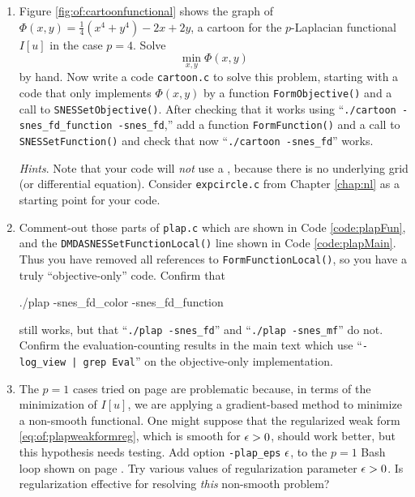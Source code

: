 \begin{enumerate}
\item Figure \ref{fig:of:cartoonfunctional} shows the graph of $\Phi(x,y)=\tfrac{1}{4}(x^4+y^4) - 2x + 2y$, a cartoon for the $p$-Laplacian functional $I[u]$ in the case $p=4$.  Solve
    $$\min_{x,y} \Phi(x,y)$$
by hand.  Now write a \PETSc code \texttt{cartoon.c} to solve this problem, starting with a code that only implements $\Phi(x,y)$ by a function \texttt{FormObjective()} and a call to \texttt{SNESSetObjective()}.  After checking that it works using ``\texttt{./cartoon -snes\_fd\_function -snes\_fd},'' add a function \texttt{FormFunction()} and a call to \texttt{SNESSetFunction()} and check that now ``\texttt{./cartoon -snes\_fd}'' works.

\emph{Hints}.  Note that your code will \emph{not} use a \pDMDA, because there is no underlying grid (or differential equation).  Consider \texttt{expcircle.c} from Chapter \ref{chap:nl} as a starting point for your code.

\item \label{exer:of:commentoutresidual}  Comment-out those parts of \texttt{plap.c} which are shown in Code \ref{code:plapFun}, and the \texttt{DMDASNESSetFunctionLocal()} line shown in Code \ref{code:plapMain}.  Thus you have removed all references to \texttt{FormFunctionLocal()}, so you have a truly ``objective-only'' code.  Confirm that
\begin{cline}
./plap -snes_fd_color -snes_fd_function
\end{cline}
still works, but that ``\texttt{./plap -snes\_fd}'' and ``\texttt{./plap -snes\_mf}'' do not.  Confirm the evaluation-counting results in the main text which use ``\texttt{-log\_view | grep Eval}'' on the objective-only implementation.

\item \label{exer:of:regularizepone}  The $p=1$ cases tried on page \pageref{page:of:casepone} are problematic because, in terms of the minimization of $I[u]$,  we are applying a gradient-based method to minimize a non-smooth \citep{NocedalWright2006} functional.  One might suppose that the regularized weak form \eqref{eq:of:plapweakformreg}, which is smooth for $\epsilon>0$, should work better, but this hypothesis needs testing.  Add option \texttt{-plap\_eps} $\epsilon$, to the $p=1$ Bash loop shown on page \pageref{page:of:casepone}.  Try various values of regularization parameter $\epsilon>0$.  Is regularization effective for resolving \emph{this} non-smooth problem?


\end{enumerate}
